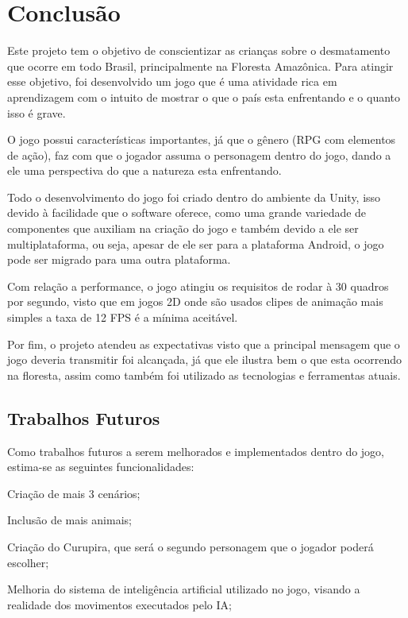 \chapter{Conclusão}
\label{chap:conclusoes-e-trabalhos-futuros}

Este projeto tem o objetivo de conscientizar as crianças sobre o desmatamento que ocorre em todo Brasil, principalmente na Floresta Amazônica. Para atingir esse objetivo, foi desenvolvido um jogo que é uma atividade rica em aprendizagem com o intuito de mostrar o que o país esta enfrentando e o quanto isso é grave.

O jogo possui características importantes, já que o gênero (RPG com elementos de ação), faz com que o jogador assuma o personagem dentro do jogo, dando a ele uma perspectiva do que a natureza esta enfrentando.

Todo o desenvolvimento do jogo foi criado dentro do ambiente da Unity, isso devido à facilidade que o software oferece, como uma grande variedade de componentes que auxiliam na criação do jogo e também devido a ele ser multiplataforma, ou seja, apesar de ele ser para a plataforma Android, o jogo pode ser migrado para uma outra plataforma.

Com relação a performance, o jogo atingiu os requisitos de rodar à 30 quadros por segundo, visto que em jogos 2D onde são usados clipes de animação mais simples a taxa de 12 FPS é a mínima aceitável. 

Por fim, o projeto atendeu as expectativas visto que a principal mensagem que o jogo deveria transmitir foi alcançada, já que ele ilustra bem o que esta ocorrendo na floresta, assim como também foi utilizado as tecnologias e ferramentas atuais.

\section{Trabalhos Futuros}
\label{sec:trabalhos-futuros}

Como trabalhos futuros a serem melhorados e implementados dentro do jogo, estima-se as seguintes funcionalidades:

\begin{alineascomponto}
	
   \item Criação de mais 3 cenários;
   \item Inclusão de mais animais;
   \item Criação do Curupira, que será o segundo personagem que o jogador poderá escolher;
   \item Melhoria do sistema de inteligência artificial utilizado no jogo, visando a realidade dos movimentos executados pelo IA;

	\end{alineascomponto}